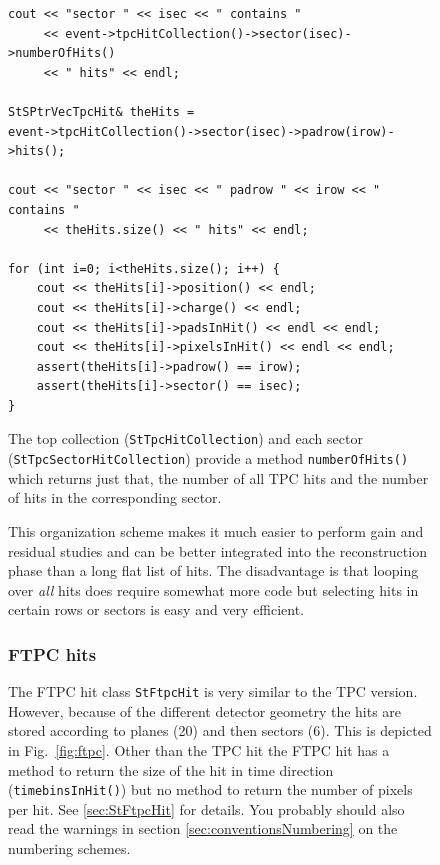 \documentclass[twoside]{article}
\begin{document}
\begin{figure}[htb]
\begin{center}
\begin{verbatim}
cout << "sector " << isec << " contains "
     << event->tpcHitCollection()->sector(isec)->numberOfHits()
     << " hits" << endl;

StSPtrVecTpcHit& theHits =
event->tpcHitCollection()->sector(isec)->padrow(irow)->hits();

cout << "sector " << isec << " padrow " << irow << " contains "
     << theHits.size() << " hits" << endl;

for (int i=0; i<theHits.size(); i++) {
    cout << theHits[i]->position() << endl;
    cout << theHits[i]->charge() << endl;
    cout << theHits[i]->padsInHit() << endl << endl;
    cout << theHits[i]->pixelsInHit() << endl << endl;
    assert(theHits[i]->padrow() == irow);
    assert(theHits[i]->sector() == isec);
}
\end{verbatim}
The top collection (\texttt{StTpcHitCollection}) and each sector 
(\texttt{StTpcSectorHitCollection}) provide a method
\texttt{numberOfHits()} which returns just that, the number of all TPC
hits and the number of hits in the corresponding sector.

This organization scheme makes it much easier to perform gain and
residual studies and can be better integrated into the reconstruction
phase than a long flat list of hits. The disadvantage is that looping
over \emph{all} hits does require somewhat more code but selecting
hits in certain rows or sectors is easy and very efficient.

\subsubsection{FTPC hits}

The FTPC hit class \texttt{StFtpcHit} is very similar to the TPC
version.  However, because of the different detector geometry the hits
are stored according to planes (20) and then sectors (6). This is
depicted in Fig.~\ref{fig:ftpc}. Other than the TPC hit the FTPC hit
has a method to return the size of the hit in time direction
(\texttt{timebinsInHit()}) but no method to return the number of
pixels per hit. See \ref{sec:StFtpcHit} for details.  You probably
should also read the warnings in section
\ref{sec:conventionsNumbering} on the numbering schemes.


\end{center}
\end{figure}
\end{document}
